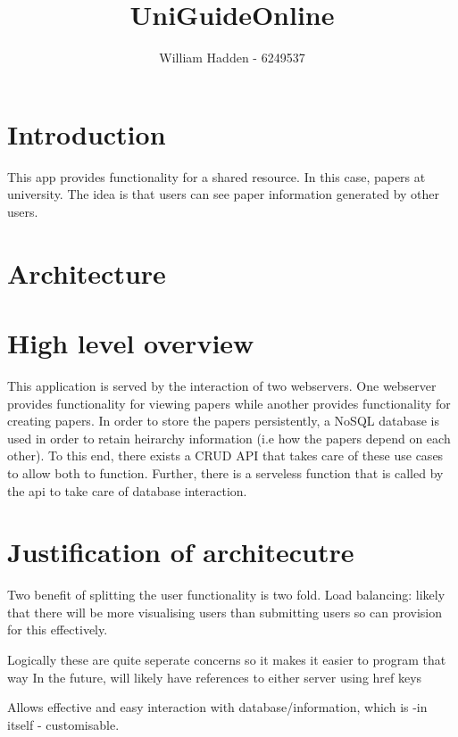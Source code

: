 \documentclass[12pt]{article}
\begin{document}
\title{UniGuideOnline \\ }

\author{William Hadden - 6249537} 

\maketitle

\section*{Introduction}

This app provides functionality for a shared resource. In this case, papers at university. The idea is that users can see paper information generated by other users. 


\section*{Architecture}
\section{High level overview}

This application is served by the interaction of two webservers. One webserver provides functionality for viewing papers while another provides functionality for creating papers. In order to store the papers persistently, a NoSQL database is used in order to retain heirarchy information (i.e how the papers depend on each other). To this end, there exists a CRUD API that takes care of these use cases to allow both to function. Further, there is a serveless function that is called by the api to take care of database interaction. 


\section{Justification of architecutre}

Two benefit of splitting the user functionality is two fold.
Load balancing:
likely that there will be more visualising users than submitting users 
so can provision for this effectively.

Logically these are quite seperate concerns so it makes it easier to program that way
In the future, will likely have references to either server using href keys

Allows effective and easy interaction with database/information, which is -in itself - customisable.
\end{document}
